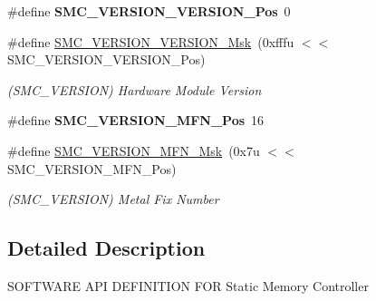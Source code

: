 \begin{DoxyCompactItemize}
\mbox{\label{group__SAMV71__SMC_ga9e4868128383f058cb82c392018297b9}} 
\#define {\bfseries S\+M\+C\+\_\+\+V\+E\+R\+S\+I\+O\+N\+\_\+\+V\+E\+R\+S\+I\+O\+N\+\_\+\+Pos}~0
\item 
\mbox{\label{group__SAMV71__SMC_gad9262b09f90e29519efe107948a09405}} 
\#define \mbox{\hyperlink{group__SAMV71__SMC_gad9262b09f90e29519efe107948a09405}{S\+M\+C\+\_\+\+V\+E\+R\+S\+I\+O\+N\+\_\+\+V\+E\+R\+S\+I\+O\+N\+\_\+\+Msk}}~(0xfffu $<$$<$ S\+M\+C\+\_\+\+V\+E\+R\+S\+I\+O\+N\+\_\+\+V\+E\+R\+S\+I\+O\+N\+\_\+\+Pos)
\begin{DoxyCompactList}\small\item\em (S\+M\+C\+\_\+\+V\+E\+R\+S\+I\+ON) Hardware Module Version \end{DoxyCompactList}\item 
\mbox{\label{group__SAMV71__SMC_ga836e40eabd05b7e42c2f9e203d8291ab}} 
\#define {\bfseries S\+M\+C\+\_\+\+V\+E\+R\+S\+I\+O\+N\+\_\+\+M\+F\+N\+\_\+\+Pos}~16
\item 
\mbox{\label{group__SAMV71__SMC_ga8865fc962b66135a6ab2c5587a194fd7}} 
\#define \mbox{\hyperlink{group__SAMV71__SMC_ga8865fc962b66135a6ab2c5587a194fd7}{S\+M\+C\+\_\+\+V\+E\+R\+S\+I\+O\+N\+\_\+\+M\+F\+N\+\_\+\+Msk}}~(0x7u $<$$<$ S\+M\+C\+\_\+\+V\+E\+R\+S\+I\+O\+N\+\_\+\+M\+F\+N\+\_\+\+Pos)
\begin{DoxyCompactList}\small\item\em (S\+M\+C\+\_\+\+V\+E\+R\+S\+I\+ON) Metal Fix Number \end{DoxyCompactList}\end{DoxyCompactItemize}


\subsection{Detailed Description}
S\+O\+F\+T\+W\+A\+RE A\+PI D\+E\+F\+I\+N\+I\+T\+I\+ON F\+OR Static Memory Controller 